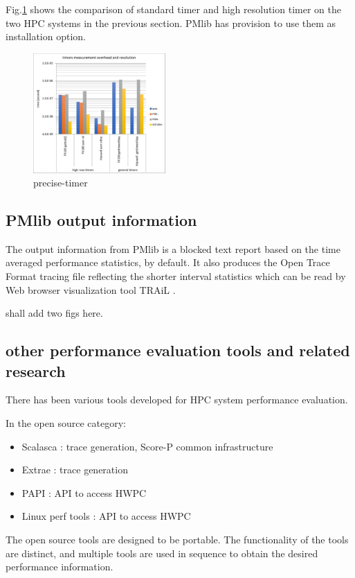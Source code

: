 \documentclass[conference]{IEEEtran}
\begin{document}
Fig.\ref{fig:precise-timer} shows the comparison of standard timer and
high resolution timer on the two HPC systems in the previous section.
PMlib has provision to use them as installation option.
\begin{figure}[tb]
\centering
\includegraphics[width=0.45\textwidth]{figs/precise-timer.pdf}
\caption{precise-timer}
\label{fig:precise-timer}
\end{figure}



\subsection{PMlib output information}

The output information from PMlib is a blocked text report based on
the time averaged performance statistics, by default.
It also produces the Open Trace Format \cite{} tracing file reflecting
the shorter interval statistics which can be read by Web browser
visualization tool TRAiL \cite{}.

{\color{blue} shall add two figs here.}

\subsection{other performance evaluation tools and related research}

There has been various tools developed for HPC system  performance evaluation.

In the open source category:
\begin{itemize}
	\item Scalasca \cite{Scalasca:2017} : trace generation, Score-P common
	infrastructure
	\item Extrae \cite{Extrae:webpage} :  trace generation
	\item PAPI \cite{PAPI:5.6} : API to access HWPC
	\item Linux perf tools : API to access HWPC
\end{itemize}
The open source tools are designed to be portable. The functionality of the
tools are distinct, and multiple tools are used in sequence to obtain
the desired performance information.
\end{document}
